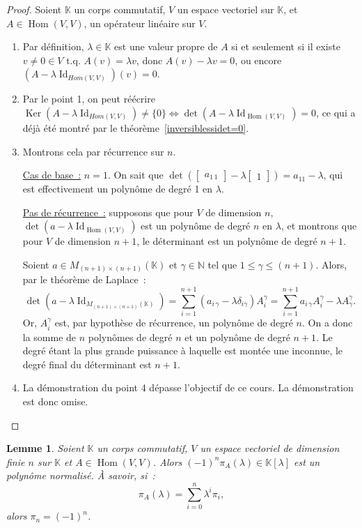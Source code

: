 \documentclass{article}
\DeclareMathOperator{\Id}{Id}
\DeclareMathOperator{\Ker}{Ker}
\DeclareMathOperator{\Hom}{Hom}
\newcommand{\N}{\mathbb N}
\newcommand{\K}{\mathbb K}
\newcommand{\M}[3]{M_{#1 \times #2}(#3)}
\newcommand{\tq}{\textrm{ t.q. }}
\newtheorem{lem}[thm]{Lemme}
\theoremstyle{definition}
\theoremstyle{remark}
\begin{document}
		\begin{proof} Soient $\K$ un corps commutatif, $V$ un espace vectoriel sur $\K$, et $A \in \Hom(V, V)$, un opérateur linéaire sur $V$.

		\begin{enumerate}
			\item Par définition, $\lambda \in \K$ est une valeur propre de $A$ si et seulement si il existe $v \neq 0 \in V \tq A(v) = \lambda v$, donc
			      $A(v) - \lambda v = 0$, ou encore $(A - \lambda\Id_{Hom(V, V)})(v) = 0$.
			\item Par le point 1, on peut réécrire $\Ker(A - \lambda\Id_{Hom(V, V)}) \neq \{0\} \iff \det(A - \lambda \Id_{\Hom(V, V)}) = 0$, ce qui a déjà été montré
			      par le théorème~\ref{inversiblessidet=0}.
			\item Montrons cela par récurrence sur $n$.

			      \underline{Cas de base~:} $n = 1$. On sait que
				  $\det\left(\begin{bmatrix}a_{1\,1}\end{bmatrix} - \lambda\begin{bmatrix}1\end{bmatrix}\right) = a_11 - \lambda$, qui est effectivement un polynôme
				  de degré 1 en $\lambda$.

				  \underline{Pas de récurrence~:} supposons que pour $V$ de dimension $n$, $\det(a - \lambda \Id_{\Hom(V, V)})$ est un polynôme de degré $n$
				  en $\lambda$, et montrons que pour $V$ de dimension $n+1$, le déterminant est un polynôme de degré $n+1$.

				  Soient $a \in \M {(n+1)}{(n+1)}\K$ et $\gamma \in \N$ tel que $1 \leq \gamma \leq (n+1)$. Alors, par le théorème de Laplace~:
				  \[\det(a - \lambda \Id_{\M {(n+1)}{(n+1)}\K}) = \sum_{i=1}^{n+1}(a_{i\,\gamma} - \lambda\delta_{i\gamma})A_i^\gamma
				    = \sum_{i=1}^{n+1}a_{i\,\gamma}A_i^\gamma - \lambda A_\gamma^\gamma.\]
				  Or, $A_i^\gamma$ est, par hypothèse de récurrence, un polynôme de degré $n$. On a donc la somme de $n$ polynômes de degré $n$ et un polynôme
				  de degré $n+1$. Le degré étant la plus grande puissance à laquelle est montée une inconnue, le degré final du déterminant est $n+1$.
			\item La démonstration du point 4 dépasse l'objectif de ce cours. La démonstration est donc omise.
		\end{enumerate}
		\end{proof}

		\begin{lem}\label{polcarnorm} Soient $\K$ un corps commutatif, $V$ un espace vectoriel  de dimension finie $n$ sur $\K$ et $A \in \Hom(V, V)$. Alors
		$(-1)^n\pi_A(\lambda) \in \K[\lambda]$ est un polynôme normalisé. À savoir, si~:
		\[\pi_A(\lambda) = \sum_{i=0}^n\lambda^i\pi_i,\]
		alors $\pi_n = (-1)^n$. \end{lem}
\end{document}
